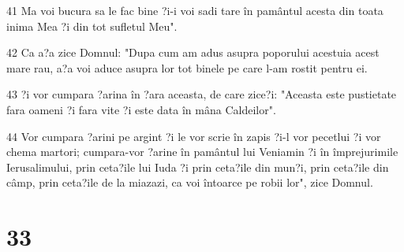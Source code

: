 \par 41 Ma voi bucura sa le fac bine ?i-i voi sadi tare în pamântul acesta din toata inima Mea ?i din tot sufletul Meu".
\par 42 Ca a?a zice Domnul: "Dupa cum am adus asupra poporului acestuia acest mare rau, a?a voi aduce asupra lor tot binele pe care l-am rostit pentru ei.
\par 43 ?i vor cumpara ?arina în ?ara aceasta, de care zice?i: "Aceasta este pustietate fara oameni ?i fara vite ?i este data în mâna Caldeilor".
\par 44 Vor cumpara ?arini pe argint ?i le vor scrie în zapis ?i-l vor pecetlui ?i vor chema martori; cumpara-vor ?arine în pamântul lui Veniamin ?i în împrejurimile Ierusalimului, prin ceta?ile lui Iuda ?i prin ceta?ile din mun?i, prin ceta?ile din câmp, prin ceta?ile de la miazazi, ca voi întoarce pe robii lor", zice Domnul.

\chapter{33}

